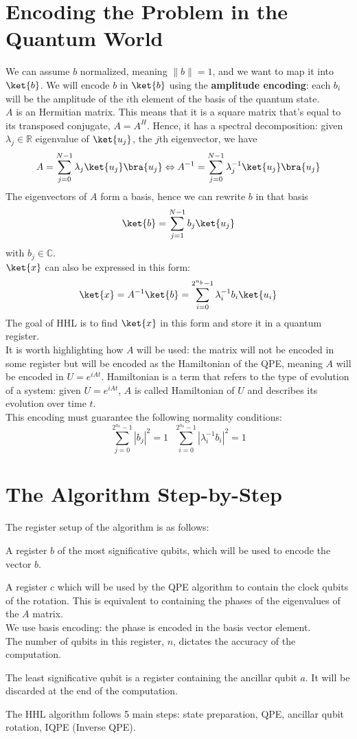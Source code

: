 \documentclass[10pt]{article}
\begin{document}
\section{Encoding the Problem in the Quantum World}
We can assume $b$ normalized, meaning $\|b\|=1$, and we want to map it into $\ket{b}$. We will encode $b$ in $\ket{b}$ using the \textbf{amplitude encoding}: each $b_i$ will be the amplitude of the $i$th element of the basis of the quantum state.\\
$A$ is an Hermitian matrix. This means that it is a square matrix that's equal to its transposed conjugate, $A=A^H$. Hence, it has a spectral decomposition: given $\lambda_j\in\mathbb{R}$ eigenvalue of $\ket{u_j}$, the $j$th eigenvector, we have 
$$A=\sum_{j=0}^{N-1} \lambda_j\ket{u_j}\bra{u_j}\Leftrightarrow A^{-1} = \sum_{j=0}^{N-1}\lambda_j^{-1}\ket{u_j}\bra{u_j}$$
The eigenvectors of $A$ form a basis, hence we can rewrite $b$ in that basis
$$\ket{b} = \sum_{j=1}^{N-1}b_j\ket{u_j}$$
with $b_j\in\mathbb{C}$.\\
$\ket{x}$ can also be expressed in this form:
$$\ket{x}=A^{-1}\ket{b}=\sum_{i=0}^{2^{n_b}-1}\lambda_i^{-1}b_i\ket{u_i}$$
The goal of HHL is to find $\ket{x}$ in this form and store it in a quantum register.\\
It is worth highlighting how $A$ will be used: the matrix will not be encoded in some register but will be encoded as the Hamiltonian of the QPE, meaning $A$ will be encoded in $U=e^{iAt}$. Hamiltonian is a term that refers to the type of evolution of a system: given $U=e^{iAt}$, $A$ is called Hamiltonian of $U$ and describes its evolution over time $t$.\\
This encoding must guarantee the following normality conditions:
$$\sum_{j=0}^{2^{n_b}-1}|b_j|^2=1\:\:\:\sum_{i=0}^{2^{n_b}-1}|\lambda_i^{-1}b_i|^2=1$$
\section{The Algorithm Step-by-Step}
The register setup of the algorithm is as follows:
\begin{list}{}{}
	\item A register $b$ of the most significative qubits, which will be used to encode the vector $b$.
	\item A register $c$ which will be used by the QPE algorithm to contain the clock qubits of the rotation. This is equivalent to containing the phases of the eigenvalues of the $A$ matrix.\\
	We use basis encoding: the phase is encoded in the basis vector element.\\
	The number of qubits in this register, $n$, dictates the accuracy of the computation.
	\item The least significative qubit is a register containing the ancillar qubit $a$. It will be discarded at the end of the computation.
\end{list}
The HHL algorithm follows 5 main steps: state preparation, QPE, ancillar qubit rotation, IQPE (Inverse QPE).
\end{document}
